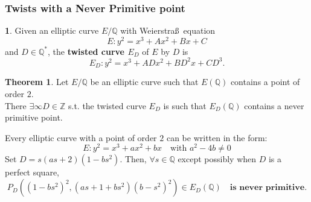 \documentclass[12pt,handout]{beamer} %
\newcommand{\Q}{\mathbb Q}
\newcommand{\Z}{\mathbb Z}
\theoremstyle{definition}
\newtheorem{teo}{Theorem}
\newtheorem{Defi}[theorem]{\translate{Definition}}
\begin{document}
\begin{frame}
 \frametitle{Twists with a Never Primitive point}

\begin{Defi} Given an elliptic curve $E/\Q$ with Weierstra\ss\ equation 
$$E: y^2=x^3+Ax^2+Bx+C$$
and $D\in\Q^*$, the \textbf{twisted curve $E_D$} of $E$ by $D$ is
$$E_D: y^2=x^3+ADx^2+BD^2x+CD^3.$$
\end{Defi}
 
 
 \begin{teo}
Let $E/\Q$ be an elliptic curve such that $E(\Q)$ contains a point of order $2$. \\
There $\exists \infty D\in\Z$ s.t. 
the twisted curve $E_D$ is such that $E_D(\Q)$ contains a never primitive point.
\end{teo}

Every elliptic curve with a point of order $2$ can be written in the form:
$$E: y^2=x^3+ax^2+bx\quad\text{with }a^2-4b\neq0$$ 
Set $D=s (a s+2)\left(1-bs^2\right)$. Then, $\forall s\in\Q$ except possibly when $D$ is a perfect square,
$$P_D\left(\left(1-bs^2\right)^2,\left(a s+1+bs^2\right)\left(b-s^2\right)^2\right)\in E_D(\Q)\quad\textbf{is never primitive}.$$

% 

 \end{frame}
\end{document}
